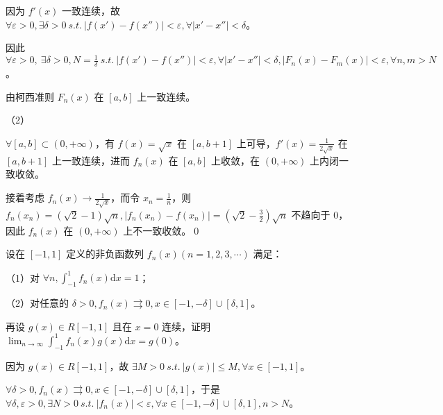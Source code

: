 因为 $\displaystyle f'( x)$ 一致连续，故 $\displaystyle \forall \varepsilon  >0,\exists \delta  >0\ s.t.\ |f( x') -f( x'') |< \varepsilon ,\forall |x'-x''|< \delta $。

因此 $\displaystyle \forall \varepsilon  >0,\ \exists \delta  >0,N=\frac{1}{\delta } \ s.t.\ |f( x') -f( x'') |< \varepsilon ,\forall |x'-x''|< \delta ,|F_{n}( x) -F_{m}( x) |< \varepsilon ,\forall n,m >N$。

由柯西准则 $\displaystyle F_{n}( x)$ 在 $\displaystyle [ a,b]$ 上一致连续。



（2）

$\displaystyle \forall [ a,b] \subset ( 0,+\infty )$，有 $\displaystyle f( x) =\sqrt{x}$ 在 $\displaystyle [ a,b+1]$ 上可导，$\displaystyle f'( x) =\frac{1}{2\sqrt{x}}$ 在 $\displaystyle [ a,b+1]$ 上一致连续，进而 $\displaystyle f_{n}( x)$ 在 $\displaystyle [ a,b]$ 上收敛，在 $\displaystyle ( 0,+\infty )$ 上内闭一致收敛。

接着考虑 $\displaystyle f_{n}( x)\rightarrow \frac{1}{2\sqrt{x}}$，而令 $\displaystyle x_{n} =\frac{1}{n}$，则 $\displaystyle f_{n}( x_{n}) =\left(\sqrt{2} -1\right)\sqrt{n} ,|f_{n}( x_{n}) -f( x_{n}) |=\left(\sqrt{2} -\frac{3}{2}\right)\sqrt{n}$ 不趋向于 $\displaystyle 0$，因此 $\displaystyle f_{n}( x)$ 在 $\displaystyle ( 0,+\infty )$ 上不一致收敛。\qed 





\begin{ques}
	设在 $\displaystyle [ -1,1]$ 定义的非负函数列 $\displaystyle f_{n}( x)( n=1,2,3,\cdots )$ 满足：

（1）对 $\displaystyle \forall n,\int _{-1}^{1} f_{n}( x)\mathrm{d} x=1$；

（2）对任意的 $\displaystyle \delta  >0,f_{n}( x) \rightrightarrows 0,x\in [ -1,-\delta ] \cup [ \delta ,1]$。

再设 $\displaystyle g( x) \in R[ -1,1]$ 且在 $\displaystyle x=0$ 连续，证明 $\displaystyle \lim _{n\rightarrow \infty }\int _{-1}^{1} f_{n}( x) g( x)\mathrm{d} x=g( 0)$。

\end{ques}


因为 $\displaystyle g( x) \in R[ -1,1]$，故 $\displaystyle \exists M >0\ s.t.\ |g( x) |\leqslant M,\forall x\in [ -1,1]$。

$\displaystyle \forall \delta  >0,f_{n}( x) \rightrightarrows 0,x\in [ -1,-\delta ] \cup [ \delta ,1]$，于是 $\displaystyle \forall \delta ,\varepsilon  >0,\exists N >0\ s.t.\ |f_{n}( x) |< \varepsilon ,\forall x\in [ -1,-\delta ] \cup [ \delta ,1] ,n >N$。

